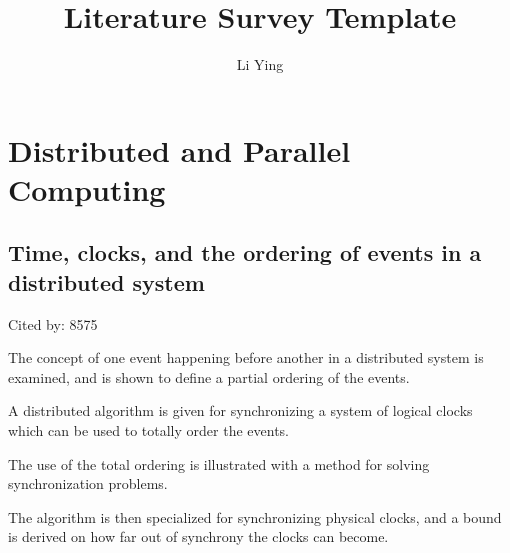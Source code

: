 \documentclass[a4paper,11pt]{article}
\author{Li Ying}
\title{Literature Survey Template}
\begin{document}
\maketitle

\section*{Distributed and Parallel Computing}

\subsection*{Time, clocks, and the ordering of events in a distributed system}
{\color{cyan} {\color{magenta} Cited by: 8575}

The concept of one event happening before another in a distributed system is examined, 
and is shown to define a partial ordering of the events. 

A distributed algorithm\cite{lamport1978time} is given 
for synchronizing a system of logical clocks which can be used to totally order the events.

The use of the total ordering is illustrated 
with a method for solving synchronization problems. 

The algorithm is then specialized 
for synchronizing physical clocks, and a bound is derived on how far out of synchrony the clocks can become.	

}


\end{document}

